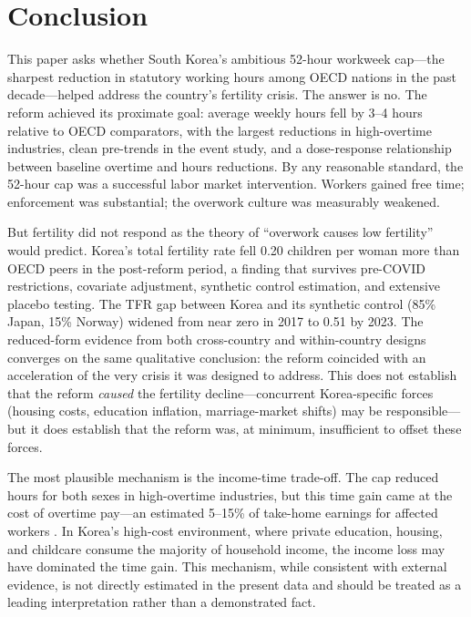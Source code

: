 \documentclass[12pt]{article}
\begin{document}
\section{Conclusion}

This paper asks whether South Korea's ambitious 52-hour workweek cap---the sharpest reduction in statutory working hours among OECD nations in the past decade---helped address the country's fertility crisis. The answer is no. The reform achieved its proximate goal: average weekly hours fell by 3--4 hours relative to OECD comparators, with the largest reductions in high-overtime industries, clean pre-trends in the event study, and a dose-response relationship between baseline overtime and hours reductions. By any reasonable standard, the 52-hour cap was a successful labor market intervention. Workers gained free time; enforcement was substantial; the overwork culture was measurably weakened.

But fertility did not respond as the theory of ``overwork causes low fertility'' would predict. Korea's total fertility rate fell 0.20 children per woman more than OECD peers in the post-reform period, a finding that survives pre-COVID restrictions, covariate adjustment, synthetic control estimation, and extensive placebo testing. The TFR gap between Korea and its synthetic control (85\% Japan, 15\% Norway) widened from near zero in 2017 to 0.51 by 2023. The reduced-form evidence from both cross-country and within-country designs converges on the same qualitative conclusion: the reform coincided with an acceleration of the very crisis it was designed to address. This does not establish that the reform \textit{caused} the fertility decline---concurrent Korea-specific forces (housing costs, education inflation, marriage-market shifts) may be responsible---but it does establish that the reform was, at minimum, insufficient to offset these forces.

The most plausible mechanism is the income-time trade-off. The cap reduced hours for both sexes in high-overtime industries, but this time gain came at the cost of overtime pay---an estimated 5--15\% of take-home earnings for affected workers \citep{kli2020workhours}. In Korea's high-cost environment, where private education, housing, and childcare consume the majority of household income, the income loss may have dominated the time gain. This mechanism, while consistent with external evidence, is not directly estimated in the present data and should be treated as a leading interpretation rather than a demonstrated fact.
\end{document}
